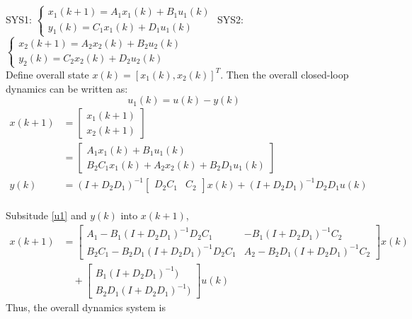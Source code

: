 \documentclass{article}
\begin{document}
\section{}
SYS1:
$
\left\{
\begin{aligned}
    x_1(k+1)=A_1x_1(k)+B_1u_1(k)\\
    y_1(k)=C_1x_1(k)+D_1u_1(k)
\end{aligned}
\right.
$
\quad SYS2:
$
\left\{
\begin{aligned}
    x_2(k+1)=A_2x_2(k)+B_2u_2(k)\\
    y_2(k)=C_2x_2(k)+D_2u_2(k)
\end{aligned}
\right.
$\\
Define overall state $x(k)=[x_1(k),x_2(k)]^T$. 
Then the overall closed-loop dynamics can be written as:
\begin{equation}
    u_1(k)=u(k)-y(k) \label{u1}
\end{equation}
\begin{align*}
    x(k+1)&=
    \begin{bmatrix}
        x_1(k+1)\\x_2(k+1)
    \end{bmatrix}\\
    &=
    \begin{bmatrix}
        A_1x_1(k)+B_1u_1(k)\\
        B_2C_1x_1(k)+A_2x_2(k)+B_2D_1u_1(k)
    \end{bmatrix}\\
    y(k)&=(I+D_2D_1)^{-1}
    \begin{bmatrix}
        D_2C_1&C_2
    \end{bmatrix}
    x(k)
    +(I+D_2D_1)^{-1}D_2D_1u(k)
\end{align*}\\
Subsitude \eqref{u1} and $y(k)$ into $x(k+1)$,
\begin{align*}
    x(k+1)&=
    \begin{bmatrix}
        A_1-B_1(I+D_2D_1)^{-1}D_2C_1&-B_1(I+D_2D_1)^{-1}C_2\\
        B_2C_1-B_2D_1(I+D_2D_1)^{-1}D_2C_1&A_2-B_2D_1(I+D_2D_1)^{-1}C_2
    \end{bmatrix}
    x(k)
    \\&\quad +
    \begin{bmatrix}
        B_1(I+D_2D_1)^{-1})\\
        B_2D_1(I+D_2D_1)^{-1})
    \end{bmatrix}
    u(k)
\end{align*}
Thus, the overall dynamics system is
\end{document}
